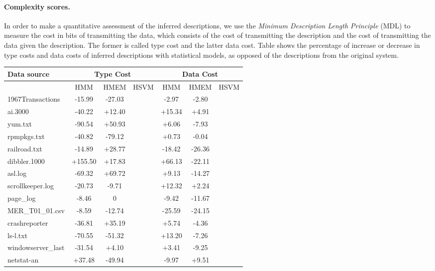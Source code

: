 \paragraph*{Complexity scores.}

In order to make a quantitative assessment of the inferred
descriptions, we use the {\em Minimum Description Length Principle}
(MDL) to measure the cost in bits of transmitting the
data, which consists of the cost of transmitting the description and
the cost of transmitting the data given the description. The former
is called type cost and the latter data cost. Table shows the
percentage of increase or decrease in type costs and data costs of
inferred descriptions with statistical models, as opposed of the
descriptions from the original \learnpads{} system.

\begin{table}
\begin{center}
\begin{tabular}{|l||c|c|c||c|c|c|}\hline
Data source & \multicolumn{3}{|c||}{Type Cost} &
\multicolumn{3}{|c|}{Data Cost}\\ \hline & HMM & HMEM & HSVM & HMM &
HMEM & HSVM \\ \hline 
1967Transactions & -15.99 & -27.03 &  & -2.97
& -2.80 &     \\\hline 
ai.3000 & -40.22 & +12.40 & & +15.34 & +4.91 & \\ \hline
yum.txt & -90.54 & +50.93 & & +6.06 & -7.93 &   \\ \hline
rpmpkgs.txt & -40.82 & -79.12 & & +0.73 & -0.04 & \\ \hline
railroad.txt & -14.89 & +28.77 & & -18.42 & -26.36 &    \\ \hline
dibbler.1000 & +155.50 & +17.83 & & +66.13 & -22.11 &     \\ \hline
asl.log & -69.32 & +69.72 & & +9.13 & -14.27 & \\ \hline
scrollkeeper.log & -20.73 & -9.71 & & +12.32 & +2.24 &  \\ \hline
page\_log & -8.46 & 0 & & -9.42 & -11.67 & \\ \hline
MER\_T01\_01.csv & -8.59 & -12.74 & & -25.59 & -24.15 & \\ \hline
crashreporter & -36.81 & +35.19 &  & +5.74 & -4.36 &  \\ \hline
ls-l.txt & -70.55 & -51.32 & & +13.20 & -7.26 &  \\ \hline
windowserver\_last & -31.54 & +4.10 & & +3.41 & -9.25 &   \\ \hline
netstat-an & +37.48 & -49.94 & & -9.97 & +9.51 &  \\ \hline

\end{tabular}
\end{center}
\end{table}

